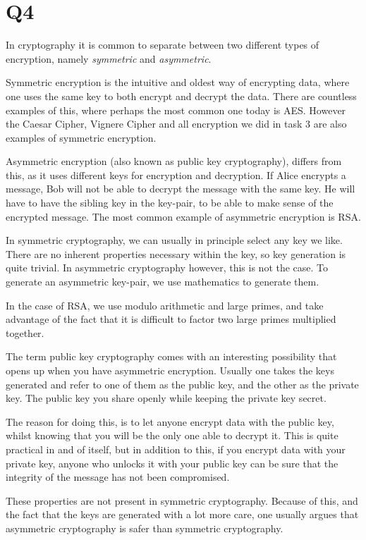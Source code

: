 \documentclass{article}
\begin{document}
\newpage
\section{Q4}

In cryptography it is common to separate between two different types of encryption, namely \textit{symmetric} and \textit{asymmetric}.

Symmetric encryption is the intuitive and oldest way of encrypting data, where one uses the same key to both encrypt and decrypt the data. There are countless examples of this, where perhaps the most common one today is AES. However the Caesar Cipher, Vignere Cipher and all encryption we did in task 3 are also examples of symmetric encryption. 

Asymmetric encryption (also known as public key cryptography), differs from this, as it uses different keys for encryption and decryption. If Alice encrypts a message, Bob will not be able to decrypt the message with the same key. He will have to have the sibling key in the key-pair, to be able to make sense of the encrypted message. The most common example of asymmetric encryption is RSA. 

In symmetric cryptography, we can usually in principle select any key we like. There are no inherent properties necessary within the key, so key generation is quite trivial. In asymmetric cryptography however, this is not the case. To generate an asymmetric key-pair, we use  mathematics to generate them. 

In the case of RSA, we use modulo arithmetic and large primes, and take advantage of the fact that it is difficult to factor two large primes multiplied together. 

The term public key cryptography comes with an interesting possibility that opens up when you have asymmetric encryption. Usually one takes the keys generated and refer to one of them as the public key, and the other as the private key. The public key you share openly while keeping the private key secret. 

The reason for doing this, is to let anyone encrypt data with the public key, whilst knowing that you will be the only one able to decrypt it. This is quite practical in and of itself, but in addition to this, if you encrypt data with your private key, anyone who unlocks it with your public key can be sure that the integrity of the message has not been compromised. 

These properties are not present in symmetric cryptography. Because of this, and the fact that the keys are generated with a lot more care, one usually argues that asymmetric cryptography is safer than symmetric cryptography. 
\end{document}
